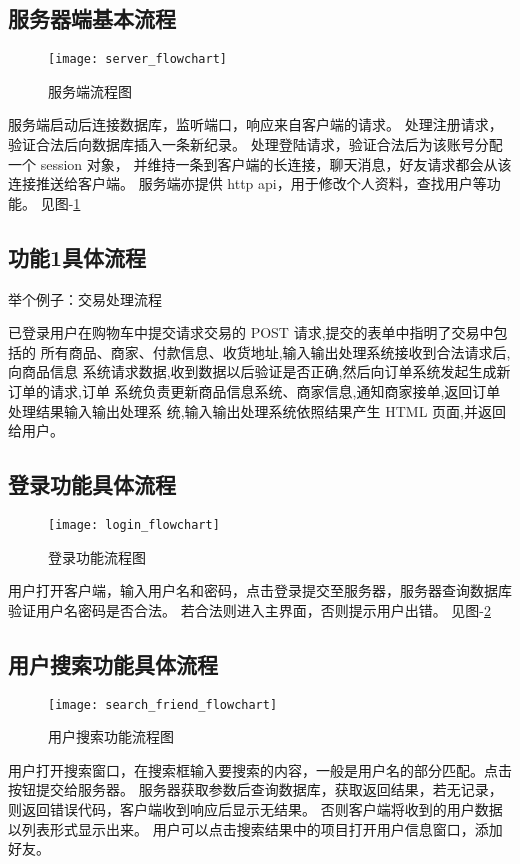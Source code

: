\subsection{服务器端基本流程}
\begin{figure}[h]
	\centering
	\texttt{[image: server\_flowchart]}
	\caption{服务端流程图} \label{fig:server_flowchart}
\end{figure}

服务端启动后连接数据库，监听端口，响应来自客户端的请求。
处理注册请求，验证合法后向数据库插入一条新纪录。
处理登陆请求，验证合法后为该账号分配一个 session 对象，
并维持一条到客户端的长连接，聊天消息，好友请求都会从该连接推送给客户端。
服务端亦提供 http api，用于修改个人资料，查找用户等功能。
见图-\ref{fig:server_flowchart}

\subsection{功能1具体流程}
举个例子：交易处理流程

已登录用户在购物车中提交请求交易的 POST 请求,提交的表单中指明了交易中包括的
所有商品、商家、付款信息、收货地址,输入输出处理系统接收到合法请求后,向商品信息
系统请求数据,收到数据以后验证是否正确,然后向订单系统发起生成新订单的请求,订单
系统负责更新商品信息系统、商家信息,通知商家接单,返回订单处理结果输入输出处理系
统,输入输出处理系统依照结果产生 HTML 页面,并返回给用户。

\subsection{登录功能具体流程}
\begin{figure}[h]
	\centering
	\texttt{[image: login\_flowchart]}
	\caption{登录功能流程图} \label{fig:login_flowchart}
\end{figure}
用户打开客户端，输入用户名和密码，点击登录提交至服务器，服务器查询数据库验证用户名密码是否合法。
若合法则进入主界面，否则提示用户出错。
见图-\ref{fig:login_flowchart}

\subsection{用户搜索功能具体流程}
\begin{figure}[h]
	\centering
	\texttt{[image: search\_friend\_flowchart]}
	\caption{用户搜索功能流程图} \label{fig:search_friend_flowchart}
\end{figure}
用户打开搜索窗口，在搜索框输入要搜索的内容，一般是用户名的部分匹配。点击按钮提交给服务器。
服务器获取参数后查询数据库，获取返回结果，若无记录，则返回错误代码，客户端收到响应后显示无结果。
否则客户端将收到的用户数据以列表形式显示出来。
用户可以点击搜索结果中的项目打开用户信息窗口，添加好友。

